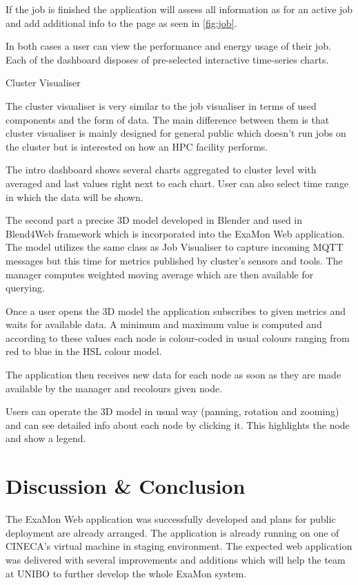 \documentclass[a4paper, twoside]{article}
\newcommand{\highlight}[1]{\textcolor{prace-orange}{#1}}
\newcommand{\itempar}[1]{\noindent\highlight{\textsf #1}\par\noindent}
\begin{document}
\begin{multicols}{3}
If the job is finished the application will assess all information as for an active job and add additional info to the page as seen in \ref{fig:job}.

In both cases a user can view the performance and energy usage of their job. Each of the dashboard disposes of pre-selected interactive time-series charts.

\itempar{Cluster Visualiser}
The cluster visualiser is very similar to the job visualiser in terms of used components and the form of data. The main difference between them is that cluster visualiser is mainly designed for general public which doesn't run jobs on the cluster but is interested on how an HPC facility performs.

The intro dashboard shows several charts aggregated to cluster level with averaged and last values right next to each chart. User can also select time range in which the data will be shown.

The second part a precise 3D model developed in Blender and used in Blend4Web framework which is incorporated into the ExaMon Web application. The model utilizes the same class as Job Visualiser to capture incoming MQTT messages but this time for metrics published by cluster's sensors and tools. The manager computes weighted moving average which are then available for querying.

Once a user opens the 3D model the application subscribes to given metrics and waits for available data. A minimum and maximum value is computed and according to these values each node is colour-coded in usual colours ranging from red to blue in the HSL colour model.

The application then receives new data for each node as soon as they are made available by the manager and recolours given node.

Users can operate the 3D model in usual way (panning, rotation and zooming) and can see detailed info about each node by clicking it. This highlights the node and show a legend.

\section*{Discussion \& Conclusion}
The ExaMon Web application was successfully developed and plans for public deployment are already arranged. The application  is already running on one of CINECA's virtual machine in staging environment. The expected web application was delivered with several improvements and additions which will help the team at UNIBO to further develop the whole ExaMon system.


\end{multicols}
\end{document}
